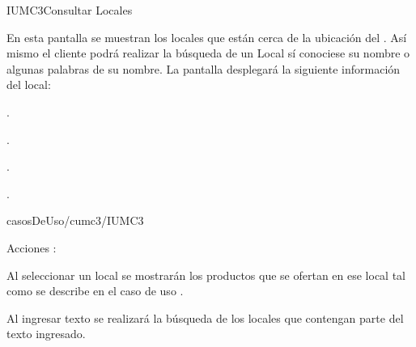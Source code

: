 \begin{IU}{IUMC3}{Consultar Locales}{En esta pantalla se muestran los locales que están cerca de la ubicación del . Así mismo el cliente podrá realizar la búsqueda de un Local sí conociese su nombre o algunas palabras de su nombre. La pantalla desplegará la siguiente información del local:	\begin{Citemize}
		\item {}.
		\item {}.
		\item {}.
		\item {}.
	\end{Citemize}}{casosDeUso/cumc3/IUMC3}
	\item[Acciones]:\hspace{1pt}
		\begin{Citemize}
			\item Al seleccionar un local se mostrarán los productos que se ofertan en ese local tal como se describe en el caso de uso .
			\item Al ingresar texto  se realizará la búsqueda de los locales que contengan parte del texto ingresado.
		\end{Citemize}

\end{IU}